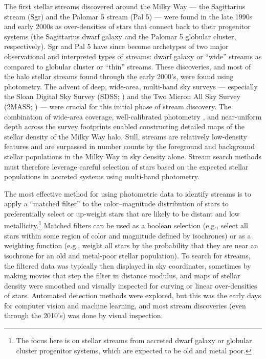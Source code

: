 \documentclass[final,5p,times,twocolumn,authoryear]{elsarticle}
\begin{document}
The first stellar streams discovered around the Milky Way --- the Sagittarius stream
(Sgr) and the Palomar 5 stream (Pal 5) --- were found in the late 1990s and early 2000s
as over-densities of stars that connect back to their progenitor systems (the
Sagittarius dwarf galaxy and the Palomar 5 globular cluster, respectively).
Sgr and Pal 5 have since become archetypes of two major observational and interpreted
types of streams: dwarf galaxy or ``wide'' streams as compared to globular cluster or
``thin'' streams.
These discoveries, and most of the halo stellar streams found through the early 2000's,
were found using photometry.
The advent of deep, wide-area, multi-band sky surveys --- especially the Sloan Digital
Sky Survey (SDSS; \citealt{york:2000, gunn:1998, fukugita:1996}) and the Two Micron All
Sky Survey (2MASS; \citealt{skrutskie:2006}) --- were crucial for this initial phase of
stream discovery.
The combination of wide-area coverage, well-calibrated photometry
\citep{padmanabhan:2008}, and near-uniform depth across the survey footprints enabled
constructing detailed maps of the stellar density of the Milky Way halo.
Still, streams are relatively low-density features and are surpassed in number counts by
the foreground and background stellar populations in the Milky Way in sky density alone.
Stream search methods must therefore leverage careful selection of stars based on the
expected stellar populations in accreted systems using multi-band photometry.

The most effective method for using photometric data to identify streams is to apply a
``matched filter'' \citep{rockosi:2002} to the color--magnitude distribution of stars
to preferentially select or up-weight stars that are likely to be distant and low
metallicity.\footnote{The focus here is on stellar streams from accreted dwarf galaxy or
globular cluster progenitor systems, which are expected to be old and metal poor.}
Matched filters can be used as a boolean selection (e.g., select all stars within some
region of color and magnitude defined by isochrones) or as a weighting function (e.g.,
weight all stars by the probability that they are near an isochrone for an old and
metal-poor stellar population).
To search for streams, the filtered data was typically then displayed in sky
coordinates, sometimes by making movies that step the filter in distance modulus, and
maps of stellar density were smoothed and visually inspected for curving or linear
over-densities of stars.
Automated detection methods were explored, but this was the early days for computer
vision and machine learning, and most stream discoveries (even through the 2010's) was
done by visual inspection.
\end{document}
